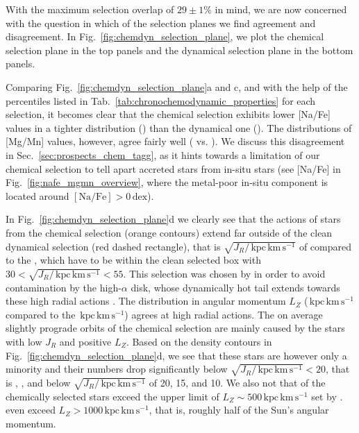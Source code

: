 \documentclass[fleqn,usenatbib]{mnras}
\newcommand{\dex}{\,\mathrm{dex}}	%
\newcommand{\kpckms}{\,\mathrm{kpc\,km\,s^{-1}}}	%
\begin{document}

With the maximum selection overlap of $29\pm1\%$ in mind, we are now concerned with the question in which of the selection planes we find agreement and disagreement. In Fig.~\ref{fig:chemdyn_selection_plane}, we plot the chemical selection plane in the top panels and the dynamical selection plane in the bottom panels.

Comparing Fig.~\ref{fig:chemdyn_selection_plane}a and c, and with the help of the percentiles listed in Tab.~\ref{tab:chronochemodynamic_properties} for each selection, it becomes clear that the chemical selection exhibits lower [Na/Fe] values in a tighter distribution () than the dynamical one (). The distributions of [Mg/Mn] values, however, agree fairly well ( vs. ). We discuss this disagreement in Sec.~\ref{sec:prospects_chem_tagg}, as it hints towards a limitation of our chemical selection to tell apart accreted stars from in-situ stars (see [Na/Fe] in Fig.~\ref{fig:nafe_mgmn_overview}, where the metal-poor in-situ component is located around $\mathrm{[Na/Fe]} > 0 \dex$).

In Fig.~\ref{fig:chemdyn_selection_plane}d we clearly see that the actions of stars from the chemical selection (orange contours) extend far outside of the clean dynamical selection (red dashed rectangle), that is $\sqrt{J_R / \kpckms}$ of  compared to the , which have to be within the clean selected box with $30 < \sqrt{J_R / \kpckms} < 55$. This selection was chosen by \citet{Feuillet2021} in order to avoid contamination by the high-$\alpha$ disk, whose dynamically hot tail extends towards these high radial actions \citep[e.g.][]{Feuillet2020, Das2020}. The distribution in angular momentum $L_Z$ ($\kpckms$ compared to the $\kpckms$) agrees at high radial actions. The on average slightly prograde orbits of the chemical selection are mainly caused by the stars with low $J_R$ and positive $L_Z$. Based on the density contours in Fig.~\ref{fig:chemdyn_selection_plane}d, we see that these stars are however only a minority and their numbers drop significantly below $\sqrt{J_R / \kpckms} < 20$, that is , , and  below $\sqrt{J_R / \kpckms}$ of 20, 15, and 10. We also not that  of the chemically selected stars exceed the upper limit of $L_Z \sim 500\kpckms$ set by \citet{Feuillet2021}.  even exceed $L_Z > 1000\kpckms$, that is, roughly half of the Sun's angular momentum.
\end{document}
